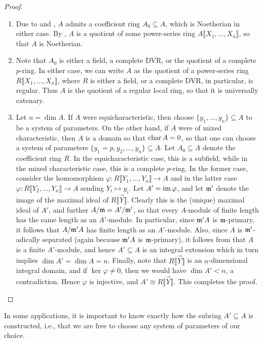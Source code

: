 \begin{proof}
\begin{enumerate}[label=(\arabic*)]
    \item Due to  and , $A$ admits a coefficient ring $A_0\subseteq A$, which is Noetherian in either case. By , $A$ is a quotient of some power-series ring $A\llbracket X_1,\dots,X_n\rrbracket$, so that $A$ is Noetherian. 
    
    \item Note that $A_0$ is either a field, a complete DVR, or the quotient of a complete $p$-ring. In either case, we can write $A$ as the quotient of a power-series ring $R\llbracket X_1,\dots, X_n\rrbracket$, where $R$ is either a field, or a complete DVR, in particular, is regular. Thus $A$ is the quotient of a regular local ring, so that it is universally catenary. 
    
    \item Let $n = \dim A$. If $A$ were equicharacteristic, then choose $\{y_1,\dots,y_n\}\subseteq A$ to be a system of parameters. On the other hand, if $A$ were of mixed characteristic, then $A$ is a domain so that $\operatorname{char} A = 0$, so that one can choose a system of parameters $\{y_1 = p, y_2,\dots, y_n\}\subseteq A$. Let $A_0\subseteq A$ denote the coefficient ring $R$. In the equicharacteristic case, this is a subfield, while in the mixed characteristic case, this is a complete $p$-ring. In the former case, consider the homomorphism $\varphi\colon R\llbracket Y_1,\dots, Y_n\rrbracket\to A$ and in the latter case $\varphi\colon R\llbracket Y_2,\dots, Y_n\rrbracket\to A$ sending $Y_i\mapsto y_i$. Let $A' = \operatorname{im}\varphi$, and let $\mathfrak{m}'$ denote the image of the maximal ideal of $R\llbracket \vec Y\rrbracket$. Clearly this is the (unique) maximal ideal of $A'$, and further $A/\mathfrak{m} = A'/\mathfrak{m}'$, so that every $A$-module of finite length has the same length as an $A'$-module. In particular, since $\mathfrak{m}' A$ is $\mathfrak{m}$-primary, it follows that $A/\mathfrak{m}' A$ has finite length as an $A'$-module. Also, since $A$ is $\mathfrak{m}'$-adically separated (again because $\mathfrak{m}'A$ is $\mathfrak{m}$-primary), it follows from  that $A$ is a finite $A'$-module, and hence $A'\subseteq A$ is an integral extension which in turn implies $\dim A' = \dim A = n$. Finally, note that $R\llbracket\vec Y\rrbracket$ is an $n$-dimensional integral domain, and if $\ker\varphi\ne 0$, then we would have $\dim A' < n$, a contradiction. Hence $\varphi$ is injective, and $A'\cong R\llbracket\vec Y\rrbracket$. This completes the proof. \qedhere
\end{enumerate}
\end{proof}

\begin{remark}
    In some applications, it is important to know exactly how the subring $A'\subseteq A$ is constructed, i.e., that we are free to choose any system of parameters of our choice. 
\end{remark}